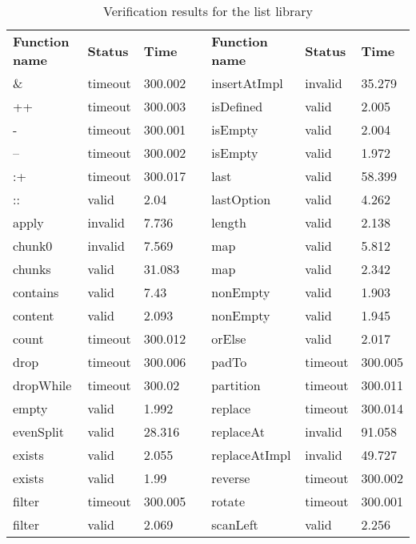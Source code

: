 \begin{table}[]
	\centering
	\caption{Verification results for the list library}
	\label{tab:res}
\begin{tabular}{lllllll}
\textbf{Function name} & \textbf{Status} & \textbf{Time} & & \textbf{Function name} & \textbf{Status} & \textbf{Time} \\
\&         & timeout & 300.002 &  & insertAtImpl  & invalid & 35.279  \\
++         & timeout & 300.003 &  & isDefined     & valid   & 2.005   \\
-          & timeout & 300.001 &  & isEmpty       & valid   & 2.004   \\
--         & timeout & 300.002 &  & isEmpty       & valid   & 1.972   \\
:+         & timeout & 300.017 &  & last          & valid   & 58.399  \\
::         & valid   & 2.04    &  & lastOption    & valid   & 4.262   \\
apply      & invalid & 7.736   &  & length        & valid   & 2.138   \\
chunk0     & invalid & 7.569   &  & map           & valid   & 5.812   \\
chunks     & valid   & 31.083  &  & map           & valid   & 2.342   \\
contains   & valid   & 7.43    &  & nonEmpty      & valid   & 1.903   \\
content    & valid   & 2.093   &  & nonEmpty      & valid   & 1.945   \\
count      & timeout & 300.012 &  & orElse        & valid   & 2.017   \\
drop       & timeout & 300.006 &  & padTo         & timeout & 300.005 \\
dropWhile  & timeout & 300.02  &  & partition     & timeout & 300.011 \\
empty      & valid   & 1.992   &  & replace       & timeout & 300.014 \\
evenSplit  & valid   & 28.316  &  & replaceAt     & invalid & 91.058  \\
exists     & valid   & 2.055   &  & replaceAtImpl & invalid & 49.727  \\
exists     & valid   & 1.99    &  & reverse       & timeout & 300.002 \\
filter     & timeout & 300.005 &  & rotate        & timeout & 300.001 \\
filter     & valid   & 2.069   &  & scanLeft      & valid   & 2.256   \\

\end{tabular}
\end{table}
